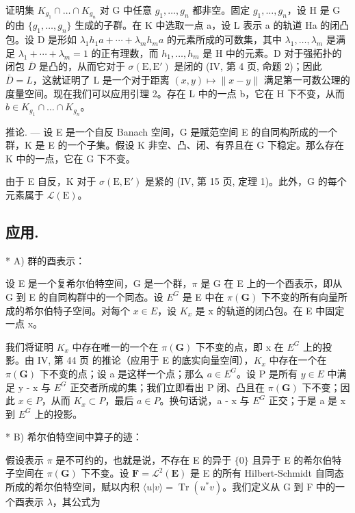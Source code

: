 证明集 \(K_{g_{1}} \cap \ldots \cap K_{g_{n}}\) 对 G 中任意 \(g_{1}, \ldots, g_{n}\) 都非空。固定 \(g_{1}, \ldots, g_{n}\)，设 H 是 G 的由 \(\{g_{1}, \ldots, g_{n}\}\) 生成的子群。在 K 中选取一点 a，设 L 表示 a 的轨道 Ha 的闭凸包。设 D 是形如 \(\lambda_{1}h_{1}a + \cdots + \lambda_{m}h_{m}a\) 的元素所成的可数集，其中 \(\lambda_{1}, \ldots, \lambda_{m}\) 是满足 \(\lambda_{1} + \cdots + \lambda_{m} = 1\) 的正有理数，而 \(h_{1}, \ldots, h_{m}\) 是 H 中的元素。D 对于强拓扑的闭包 \(\overline{D}\) 是凸的，从而它对于 \(\sigma(\mathrm{E}, \mathrm{E}')\) 是闭的 (IV, 第 4 页, 命题 2)；因此 \(\overline{D} = L\)，这就证明了 L 是一个对于距离 \((x, y) \mapsto \|x - y\|\) 满足第一可数公理的度量空间。现在我们可以应用引理 2。存在 L 中的一点 b，它在 H 下不变，从而 \(b \in K_{g_{1}} \cap \ldots \cap K_{g_{n}}\)。

推论. --- 设 E 是一个自反 Banach 空间，G 是赋范空间 E 的自同构所成的一个群，K 是 E 的一个子集。假设 K 非空、凸、闭、有界且在 G 下稳定。那么存在 K 中的一点，它在 G 下不变。

由于 E 自反，K 对于 \(\sigma(\mathrm{E}, \mathrm{E}')\) 是紧的 (IV, 第 15 页, 定理 1)。此外，G 的每个元素属于 \(\mathcal{L}(\mathrm{E})\)。

\subsection{应用.}

* A) 群的酉表示：

设 E 是一个复希尔伯特空间，G 是一个群，\(\pi\) 是 G 在 E 上的一个酉表示，即从 G 到 E 的自同构群中的一个同态。设 \(E^{G}\) 是 E 中在 \(\pi(\mathbf{G})\) 下不变的所有向量所成的希尔伯特子空间。对每个 \(x \in E\)，设 \(K_{x}\) 是 x 的轨道的闭凸包。在 E 中固定一点 x。

我们将证明 \(K_{x}\) 中存在唯一的一个在 \(\pi(\mathbf{G})\) 下不变的点，即 x 在 \(E^{G}\) 上的投影。由 IV, 第 44 页 的推论（应用于 E 的底实向量空间），\(K_{x}\) 中存在一个在 \(\pi(\mathbf{G})\) 下不变的点；设 a 是这样一个点；那么 \(a \in E^{G}\)。设 P 是所有 \(y \in E\) 中满足 y - x 与 \(E^{G}\) 正交者所成的集；我们立即看出 P 闭、凸且在 \(\pi(\mathbf{G})\) 下不变；因此 \(x \in P\)，从而 \(K_{x} \subset P\)，最后 \(a \in P\)。换句话说，a - x 与 \(E^{G}\) 正交；于是 a 是 x 到 \(E^{G}\) 上的投影。

* B) 希尔伯特空间中算子的迹：

假设表示 \(\pi\) 是不可约的，也就是说，不存在 E 的异于 \(\{0\}\) 且异于 E 的希尔伯特子空间在 \(\pi(\mathbf{G})\) 下不变。设 \(\mathbf{F} = \mathcal{L}^{2}(\mathbf{E})\) 是 E 的所有 Hilbert-Schmidt 自同态所成的希尔伯特空间，赋以内积 \(\langle u|v\rangle = \operatorname{Tr}(u^{*}v)\)。我们定义从 G 到 F 中的一个酉表示 \(\lambda\)，其公式为

